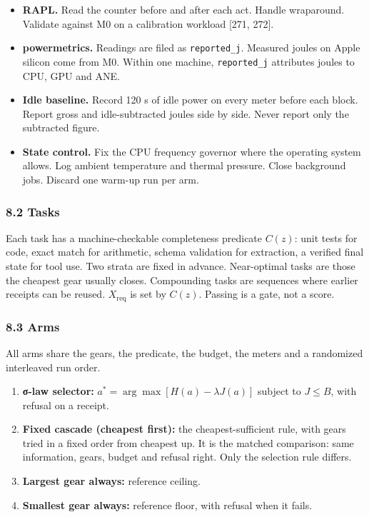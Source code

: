 \documentclass[
  10pt,
]{article}
\providecommand{\tightlist}{%
  \setlength{\itemsep}{0pt}\setlength{\parskip}{0pt}}
\begin{document}
\begin{itemize}
\tightlist
\item
  \textbf{RAPL.} Read the counter before and after each act. Handle
  wraparound. Validate against M0 on a calibration workload {[}271,
  272{]}.
\item
  \textbf{powermetrics.} Readings are filed as \texttt{reported\_j}.
  Measured joules on Apple silicon come from M0. Within one machine,
  \texttt{reported\_j} attributes joules to CPU, GPU and ANE.
\item
  \textbf{Idle baseline.} Record 120 s of idle power on every meter
  before each block. Report gross and idle-subtracted joules side by
  side. Never report only the subtracted figure.
\item
  \textbf{State control.} Fix the CPU frequency governor where the
  operating system allows. Log ambient temperature and thermal pressure.
  Close background jobs. Discard one warm-up run per arm.
\end{itemize}

\subsubsection{8.2 Tasks}\label{tasks}

Each task has a machine-checkable completeness predicate \(C(z)\): unit
tests for code, exact match for arithmetic, schema validation for
extraction, a verified final state for tool use. Two strata are fixed in
advance. Near-optimal tasks are those the cheapest gear usually closes.
Compounding tasks are sequences where earlier receipts can be reused.
\(X_{\mathrm{req}}\) is set by \(C(z)\). Passing is a gate, not a score.

\subsubsection{8.3 Arms}\label{arms}

All arms share the gears, the predicate, the budget, the meters and a
randomized interleaved run order.

\begin{enumerate}
\def\labelenumi{\arabic{enumi}.}
\tightlist
\item
  \textbf{σ-law selector:} \(a^* = \arg\max[H(a) - \lambda J(a)]\)
  subject to \(J \le B\), with refusal on a receipt.
\item
  \textbf{Fixed cascade (cheapest first):} the cheapest-sufficient rule,
  with gears tried in a fixed order from cheapest up. It is the matched
  comparison: same information, gears, budget and refusal right. Only
  the selection rule differs.
\item
  \textbf{Largest gear always:} reference ceiling.
\item
  \textbf{Smallest gear always:} reference floor, with refusal when it
  fails.
\end{enumerate}
\end{document}
